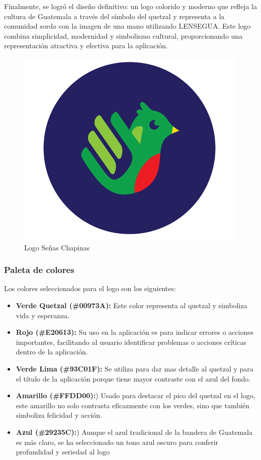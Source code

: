 Finalmente, se logró el diseño definitivo: un logo colorido y moderno que refleja la cultura de Guatemala a través del símbolo del quetzal y representa a la comunidad sorda con la imagen de una mano utilizando LENSEGUA. Este logo combina simplicidad, modernidad y simbolismo cultural, proporcionando una representación atractiva y efectiva para la aplicación. 


\begin{figure} [H]
    \centering
    \includegraphics[width=0.4\linewidth]{figuras/logo_final.png}
    \caption{Logo Señas Chapinas}
    \label{fig:enter-label}
\end{figure}




\subsubsection{Paleta de colores}


Los colores seleccionados para el logo son los siguientes:


\begin{itemize}
    
    \item \textbf{Verde Quetzal (\#00973A):} Este color representa al quetzal y simboliza vida y esperanza. 
       
    \item \textbf{Rojo (\#E20613):}  Su uso en la aplicación es para indicar errores o acciones importantes, facilitando al usuario identificar problemas o acciones críticas dentro de la aplicación.

    \item \textbf{Verde Lima (\#93C01F):} Se utiliza para dar mas detalle al quetzal y para el título de la aplicación porque tiene mayor contraste con el azul del fondo. 
    
    \item \textbf{Amarillo (\#FFDD00):}) Usado para destacar el pico del quetzal en el logo, este amarillo no solo contrasta eficazmente con los verdes, sino que también simboliza felicidad y acción. 

    \item \textbf{Azul (\#29235C):}) Aunque el azul tradicional de la bandera de Guatemala es más claro, se ha seleccionado un tono azul oscuro para conferir profundidad y seriedad al logo
    
\end{itemize}

